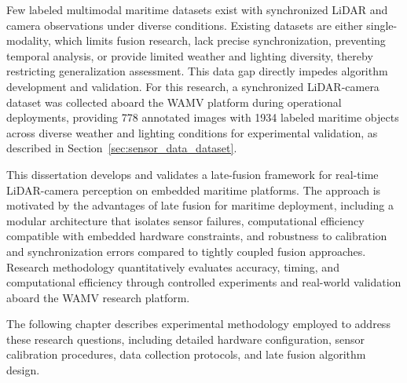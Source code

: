 \documentclass[../main.tex]{subfiles}
\begin{document}
Few labeled multimodal maritime datasets exist with synchronized \ac{LiDAR} and camera observations under diverse conditions.
Existing datasets are either single-modality, which limits fusion research, lack precise synchronization, preventing temporal analysis, or provide limited weather and lighting diversity, thereby restricting generalization assessment.
This data gap directly impedes algorithm development and validation.
For this research, a synchronized \ac{LiDAR}-camera dataset was collected aboard the \acl{WAMV} platform during operational deployments, providing 778 annotated images with 1934 labeled maritime objects across diverse weather and lighting conditions for experimental validation, as described in Section~\ref{sec:sensor_data_dataset}.

This dissertation develops and validates a late-fusion framework for real-time \ac{LiDAR}-camera perception on embedded maritime platforms.
The approach is motivated by the advantages of late fusion for maritime deployment, including a modular architecture that isolates sensor failures, computational efficiency compatible with embedded hardware constraints, and robustness to calibration and synchronization errors compared to tightly coupled fusion approaches.
Research methodology quantitatively evaluates accuracy, timing, and computational efficiency through controlled experiments and real-world validation aboard the \ac{WAMV} research platform.

The following chapter describes experimental methodology employed to address these research questions, including detailed hardware configuration, sensor calibration procedures, data collection protocols, and late fusion algorithm design.
\end{document}
